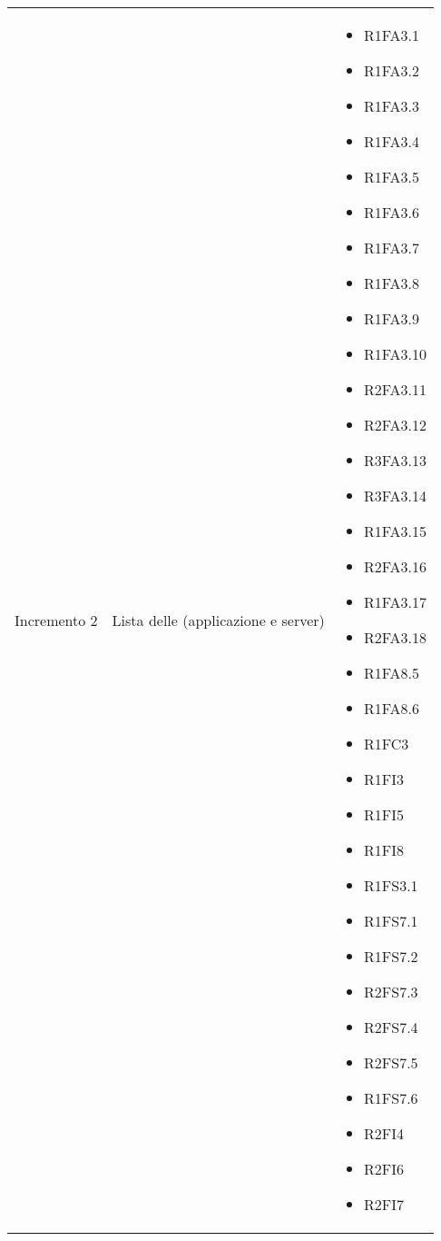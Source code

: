 {\begin{longtable}{C{4cm} C{6cm} C{4cm}}
Incremento 2 & Lista delle  (applicazione e server) & \begin{itemize}
    \item[ ] R1FA3.1
    \item[ ] R1FA3.2
    \item[ ] R1FA3.3
    \item[ ] R1FA3.4
    \item[ ] R1FA3.5
    \item[ ] R1FA3.6
    \item[ ] R1FA3.7
    \item[ ] R1FA3.8
    \item[ ] R1FA3.9 
    \item[ ] R1FA3.10
    \item[ ] R2FA3.11
    \item[ ] R2FA3.12
    \item[ ] R3FA3.13
    \item[ ] R3FA3.14
    \item[ ] R1FA3.15
    \item[ ] R2FA3.16
    \item[ ] R1FA3.17
    \item[ ] R2FA3.18 
    \item[ ] R1FA8.5
    \item[ ] R1FA8.6
    \item[ ] R1FC3
    \item[ ] R1FI3
    \item[ ] R1FI5
    \item[ ] R1FI8
    \item[ ] R1FS3.1
    \item[ ] R1FS7.1
    \item[ ] R1FS7.2
    \item[ ] R2FS7.3
    \item[ ] R2FS7.4
    \item[ ] R2FS7.5 
    \item[ ] R1FS7.6
    \item[ ] R2FI4
    \item[ ] R2FI6
    \item[ ] R2FI7
\end{itemize}\\


\end{longtable}}
